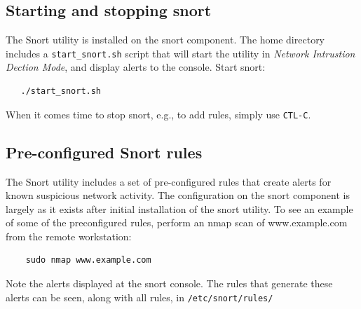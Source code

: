 \subsection{Starting and stopping snort}
The Snort utility is installed on the snort component.  The home directory includes a {\tt start\_snort.sh}
script that will start the utility in \textit{Network Intrustion Dection Mode}, and display alerts
to the console.  Start snort:
\begin{verbatim}
   ./start_snort.sh
\end{verbatim}
When it comes time to stop snort, e.g., to add rules, simply use {\tt CTL-C}.

\subsection{Pre-configured Snort rules}
The Snort utility includes a set of pre-configured rules that create alerts for known
suspicious network activity. The configuration on the snort component is largely as it
exists after initial installation of the snort utility.  To see an example of 
some of the preconfigured rules, perform an nmap scan of www.example.com from the remote
workstation:
\begin{verbatim}
    sudo nmap www.example.com
\end{verbatim}
\noindent Note the alerts displayed at the snort console.  The rules that generate these alerts can be seen,
along with all rules, in {\tt /etc/snort/rules/}

